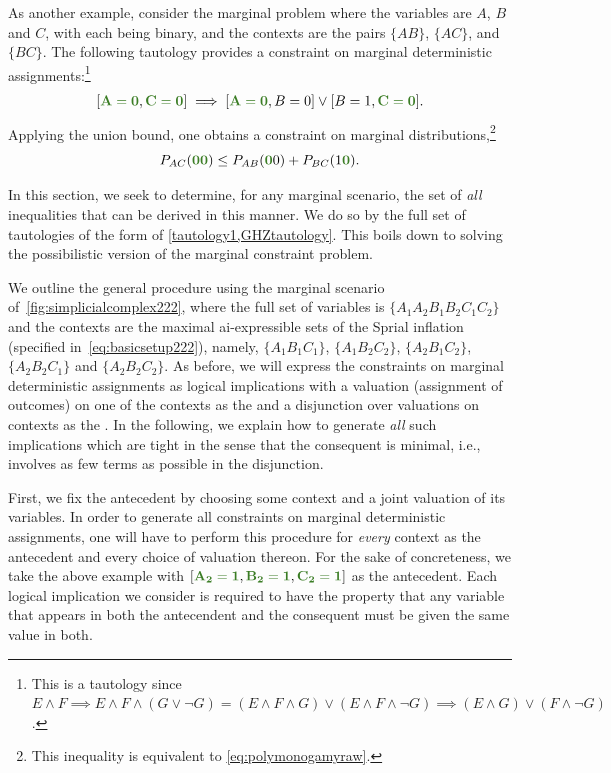 \documentclass[aps,english,10pt,superscriptaddress,onecolumn,twoside,longbibliography,pra,floatfix,fleqn,nofootinbib]{revtex4-1}%
\newcommand*{\mgreen}[1]{{\color{OliveGreen}{\mathbf{#1}}}}
\newcommand*{\tblue}[1]{{\color{MidnightBlue}{\textbf{#1}}}}
\theoremstyle{definition}
\newcounter{example}[section]
\newcommand{\eql}{=}
\DeclarePairedDelimiter{\bracks}{\lbrack}{\rbrack}
\begin{document}
As another example, consider the marginal problem where the variables are $A$, $B$ and $C$, with each being binary, and the contexts are the pairs $\{AB\}$, $\{AC\}$, and $\{BC\}$.  
The following tautology provides a constraint on marginal deterministic assignments:\footnote{This is a tautology since $E \land F  \implies  E \land F \land (G \lor \lnot G) = (E \land F \land G) \lor (E\land F \land \lnot G) \implies (E \land G) \lor (F \land \lnot G)$.}
\begin{align}\label{GHZtautology}
 \bracks{\mgreen{A \eql 0}, \mgreen{C \eql 0}} \implies \bracks{\mgreen{A \eql 0}, B \eql 0} \lor \bracks{B \eql 1, \mgreen{C \eql 0}}.
\end{align}
Applying the union bound, one obtains a constraint on marginal distributions,\footnote{This inequality is equivalent to \cref{eq:polymonogamyraw}.}
\[
P_{AC}(\mgreen{0 0}) \leq P_{AB}(\mgreen{0} 0) + P_{BC}(1 \mgreen{0}).
\]

In this section, we seek to determine, for any marginal scenario, the set of \emph{all} inequalities that can be derived in this manner.  We do so by \tblue{enumerating} the full set of tautologies of the form of \cref{tautology1,GHZtautology}. This boils down to solving the possibilistic version of the marginal constraint problem.

We outline the general procedure using the marginal scenario of~\cref{fig:simplicialcomplex222}, where the full set of variables is $\{ A_1 A_2 B_1 B_2 C_1 C_2\}$ and the contexts are the maximal ai-expressible sets of the Sprial inflation  (specified in~\cref{eq:basicsetup222}), namely, $\{A_1 B_1 C_1\}$, $\{A_1 B_2 C_2\}$, $\{A_2 B_1 C_2\}$, $\{A_2 B_2 C_1\}$ and $\{A_2 B_2 C_2\}$.  As before, we will express the constraints on marginal deterministic assignments as logical implications with
a valuation (assignment of outcomes) on one of the contexts as the \tblue{antecedent} and a disjunction over valuations on contexts as the \tblue{consequent}. In the following, we explain how to generate \emph{all} such implications which are tight in the sense that the consequent is minimal, i.e., involves as few terms as possible in the disjunction. 

First, we fix the antecedent by choosing some context and a joint valuation of its variables. In order to generate all constraints on marginal deterministic assignments, one will have to perform this procedure for \emph{every} context as the antecedent and every choice of valuation thereon. For the sake of concreteness, we take the above example with $\bracks{\mgreen{A_2 \eql 1}, \mgreen{B_2 \eql 1}, \mgreen{C_2 \eql 1}}$ as the antecedent.  
Each logical implication we consider is required to have the property that any variable that appears in both the antecendent and the consequent must be given the same value in both. 
\end{document}
